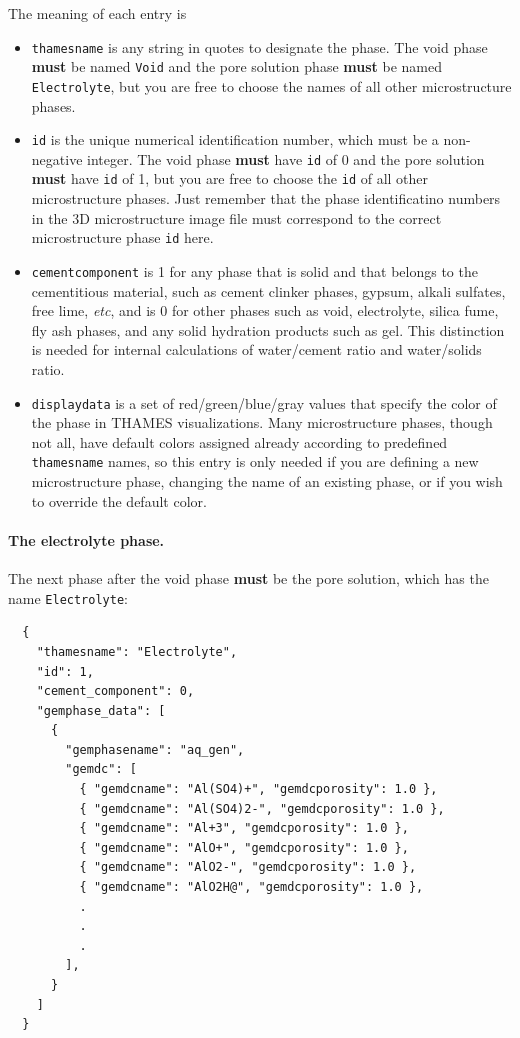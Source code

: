 \documentclass{article}
\newcommand{\us}{\underline{\phantom{X}}}
\begin{document}
{\normalsize{ }
The meaning of each entry is
\begin{itemize}
	\item \verb!thamesname! is any string in quotes to designate the phase.
	      The void phase \textbf{must} be named \verb!Void! and the pore
	      solution phase \textbf{must} be named \verb!Electrolyte!, but
	      you are free to choose the names of all other microstructure phases.
	\item  \verb!id! is the unique numerical identification number, which
	      must be a non-negative integer. The void phase \textbf{must} have
	      \verb!id! of 0 and the pore solution \textbf{must} have
	      \verb!id! of 1, but you are free to choose the \verb!id!
	      of all other microstructure phases. Just remember that the phase
	      identificatino numbers in the 3D microstructure image file must
	      correspond to the correct microstructure phase \verb!id! here.
	\item \texttt{cement{\us}component} is 1 for any phase that is solid and
	      that belongs to the cementitious material, such as cement clinker phases, gypsum,
	      alkali sulfates, free lime, \textit{etc}, and is 0 for other
	      phases such as void, electrolyte, silica fume, fly ash phases, and
	      any solid hydration products such as  gel. This distinction
	      is needed for internal calculations of water/cement ratio and
	      water/solids ratio.
	\item \texttt{display{\us}data} is a set of red/green/blue/gray values
	      that specify the color of the phase in THAMES visualizations. Many
	      microstructure phases, though not all, have default colors assigned
	      already according to predefined \verb!thamesname! names, so this entry
	      is only needed if you are defining a new
	      microstructure phase, changing the name of an existing phase,
	      or if you wish to override the default color.
\end{itemize}

\paragraph{The electrolyte phase.} The next phase after the void phase
\textbf{must} be the pore solution, which has the name \verb!Electrolyte!:
\scriptsize{
	\begin{lstlisting}
  {
    "thamesname": "Electrolyte",
    "id": 1,
    "cement_component": 0,
    "gemphase_data": [
      {
        "gemphasename": "aq_gen",
        "gemdc": [
          { "gemdcname": "Al(SO4)+", "gemdcporosity": 1.0 },
          { "gemdcname": "Al(SO4)2-", "gemdcporosity": 1.0 },
          { "gemdcname": "Al+3", "gemdcporosity": 1.0 },
          { "gemdcname": "AlO+", "gemdcporosity": 1.0 },
          { "gemdcname": "AlO2-", "gemdcporosity": 1.0 },
          { "gemdcname": "AlO2H@", "gemdcporosity": 1.0 },
          .
          .
          .
        ],
      }
    ]
  }
\end{lstlisting}
}

}
\end{document}
